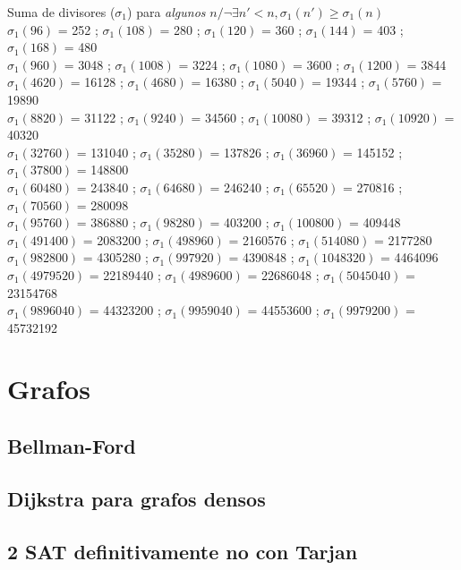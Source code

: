 %
Suma de divisores ($\sigma_1$) para \emph{algunos} $n / \neg\exists n'<n, \sigma_1(n') \geqslant \sigma_1(n)$ \\
$\sigma_1(96)$ = 252 ; $\sigma_1(108)$ = 280 ; $\sigma_1(120)$ = 360 ; $\sigma_1(144)$ = 403 ; $\sigma_1(168)$ = 480 \\
$\sigma_1(960)$ = 3048 ; $\sigma_1(1008)$ = 3224 ; $\sigma_1(1080)$ = 3600 ; $\sigma_1(1200)$ = 3844 \\
$\sigma_1(4620)$ = 16128 ; $\sigma_1(4680)$ = 16380 ; $\sigma_1(5040)$ = 19344 ; $\sigma_1(5760)$ = 19890 \\
$\sigma_1(8820)$ = 31122 ; $\sigma_1(9240)$ = 34560 ; $\sigma_1(10080)$ = 39312 ; $\sigma_1(10920)$ = 40320 \\
$\sigma_1(32760)$ = 131040 ; $\sigma_1(35280)$ = 137826 ; $\sigma_1(36960)$ = 145152 ; $\sigma_1(37800)$ = 148800 \\
$\sigma_1(60480)$ = 243840 ; $\sigma_1(64680)$ = 246240 ; $\sigma_1(65520)$ = 270816 ; $\sigma_1(70560)$ = 280098 \\
$\sigma_1(95760)$ = 386880 ; $\sigma_1(98280)$ = 403200 ; $\sigma_1(100800)$ = 409448  \\
$\sigma_1(491400)$ = 2083200 ; $\sigma_1(498960)$ = 2160576 ; $\sigma_1(514080)$ = 2177280 \\
$\sigma_1(982800)$ = 4305280 ; $\sigma_1(997920)$ = 4390848 ; $\sigma_1(1048320)$ = 4464096 \\
$\sigma_1(4979520)$ = 22189440 ; $\sigma_1(4989600)$ = 22686048 ; $\sigma_1(5045040)$ = 23154768 \\
$\sigma_1(9896040)$ = 44323200 ; $\sigma_1(9959040)$ = 44553600 ; $\sigma_1(9979200)$ = 45732192
%
%


\section{Grafos}%
\subsection{Bellman-Ford}

\subsection{Dijkstra para grafos densos}

\subsection{2 SAT definitivamente no con Tarjan}
